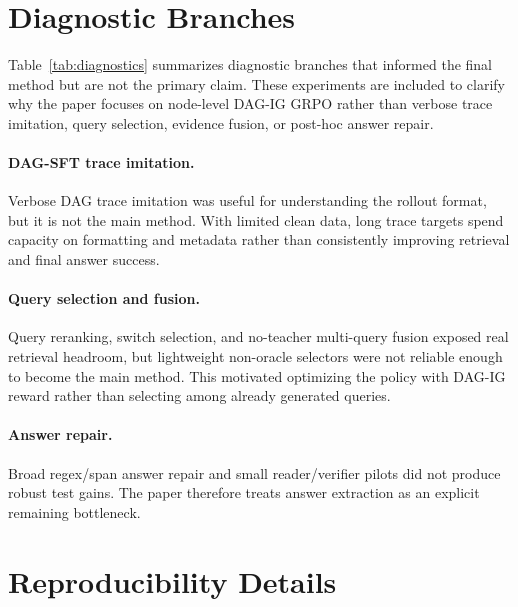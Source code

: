 \section{Diagnostic Branches}

Table~\ref{tab:diagnostics} summarizes diagnostic branches that informed the final method but are not the primary claim. These experiments are included to clarify why the paper focuses on node-level DAG-IG GRPO rather than verbose trace imitation, query selection, evidence fusion, or post-hoc answer repair.

\begin{table}[htbp]
\centering
\small
\resizebox{\linewidth}{!}{}
\caption{Diagnostic branches and their role in the final paper narrative.}
\label{tab:diagnostics}
\end{table}

\paragraph{DAG-SFT trace imitation.}
Verbose DAG trace imitation was useful for understanding the rollout format, but it is not the main method. With limited clean data, long trace targets spend capacity on formatting and metadata rather than consistently improving retrieval and final answer success.

\paragraph{Query selection and fusion.}
Query reranking, switch selection, and no-teacher multi-query fusion exposed real retrieval headroom, but lightweight non-oracle selectors were not reliable enough to become the main method. This motivated optimizing the policy with DAG-IG reward rather than selecting among already generated queries.

\paragraph{Answer repair.}
Broad regex/span answer repair and small reader/verifier pilots did not produce robust test gains. The paper therefore treats answer extraction as an explicit remaining bottleneck.

\section{Reproducibility Details}

